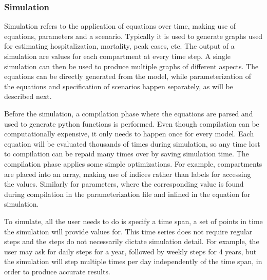 \subsubsection{Simulation}

Simulation refers to the application of equations over time, making use of equations, parameters and a scenario. Typically it is used to generate graphs used for estimating hospitalization, mortality, peak cases, etc. The output of a simulation are values for each compartment at every time step. A single simulation can then be used to produce multiple graphs of different aspects. The equations can be directly generated from the model, while parameterization of the equations and specification of scenarios happen separately, as will be described next. 

Before the simulation, a compilation phase where the equations are parsed and used to generate python functions is performed. Even though compilation can be computationally expensive, it only needs to happen once for every model. Each equation will be evaluated thousands of times during simulation, so any time lost to compilation can be repaid many times over by saving simulation time. The compilation phase applies some simple optimizations. For example, compartments are placed into an array, making use of indices rather than labels for accessing the values. Similarly for parameters, where the corresponding value is found during compilation in the parameterization file and inlined in the equation for simulation.

To simulate, all the user needs to do is specify a time span, a set of points in time the simulation will provide values for. This time series does not require regular steps and the steps do not necessarily dictate simulation detail. For example, the user may ask for daily steps for a year, followed by weekly steps for 4 years, but the simulation will step multiple times per day independently of the time span, in order to produce accurate results.

